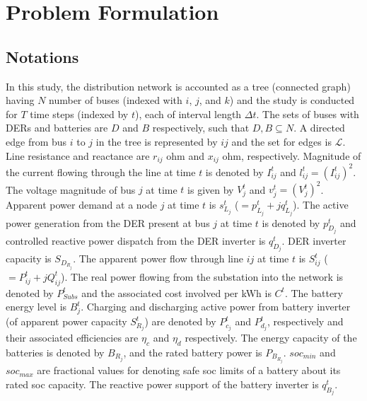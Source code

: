 \documentclass[../../outputs/main.tex]{subfiles}
\begin{document}
\section{Problem Formulation}

\subsection{Notations}
In this study, the distribution network is accounted as a tree (connected graph) having $N$ number of buses (indexed with \(i\), \(j\), and \(k\)) and the study is conducted for $T$ time steps (indexed by $t$), each of interval length $\Delta t$. The sets of buses with DERs and batteries are $D$ and $B$ respectively, such that $D, B \subseteq N$.
A directed edge from bus $i$ to $j$ in the tree is represented by $ij$ and the set for edges is $\mathcal{L}$. Line resistance and reactance are \(r_{ij}\) ohm and \(x_{ij}\) ohm, respectively. Magnitude of the current flowing through the line at time \(t\) is denoted by \(I_{ij}^t\) and  $l_{ij}^t=\left(I_{ij}^t\right)^2$. The voltage magnitude of bus \(j\) at time \(t\) is given by \(V_j^t\) and  $v_j^t=\left(V_j^t\right)^2$. Apparent power demand at a node \(j\) at time \(t\) is \(s^t_{L_j}\) (\(=p^t_{L_j}+\textit{j}q^t_{L_j}\)). The active power generation from the DER present at bus \(j\) at time \(t\) is denoted by \(p^t_{D_j}\) and controlled reactive power dispatch from the DER inverter is \(q^t_{D_j}\). DER inverter capacity is $S_{D_{R_j}}$.
The apparent power flow through line {\(ij\)} at time \(t\) is \(S_{ij}^t\) (\(=P_{ij}^t+\textit{j}Q_{ij}^t\)). The real power flowing from the substation into the network is denoted by $P^t_{Subs}$ and the associated cost involved per kWh is $C^t$. The battery energy level is \(B_j^t\). Charging and discharging active power from battery inverter (of apparent power capacity $S^{t}_{R_j}$) are denoted by \(P_{c_j}^t\) and \(P_{d_j}^t\), respectively and their associated efficiencies are $\eta_c$ and $\eta_d$ respectively. The energy capacity of the batteries is denoted by $B_{R_j}$, and the rated battery power is $P_{B_{R_j}}$. $soc_{min}$ and $soc_{max}$ are fractional values for denoting safe soc limits of a battery about its rated soc capacity. The reactive power support of the battery inverter is \(q_{B_j}^t\). 
\end{document}
